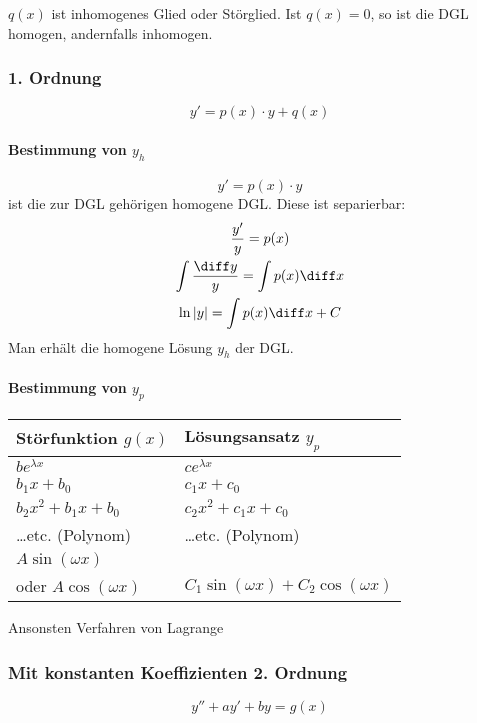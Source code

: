 		$q(x)$ ist inhomogenes Glied oder Störglied.
		Ist $q(x) = 0$, so ist die DGL homogen, andernfalls inhomogen.
		
		\subsubsection{1. Ordnung} %
			\[
				y' = p(x) \cdot y + q(x)
			\]
			
			\paragraph{Bestimmung von $y_h$} %
				\[
					y' = p(x) \cdot y
				\]
				ist die zur DGL gehörigen homogene DGL. Diese ist separierbar:
				\begin{gather*}
					\frac{y'}{y} = p(x) \\
					\int \frac{\diff y}{y} = \int p(x) \diff x \\
					\ln |y| = \int p(x) \diff x + C
				\end{gather*}
				Man erhält die homogene Lösung $y_h$ der DGL.
			
			\paragraph{Bestimmung von $y_p$} %
				
				\mbox{}
				\vspace{8pt}
				
				\begin{tabular}{l@{$\qquad$}l}
					\toprule
					\textbf{Störfunktion $g(x)$} & \textbf{Lösungsansatz $y_p$} \\
					\midrule
					$b e^{\lambda x}$ & $c e^{\lambda x}$ \\ [5pt]
					$b_1 x + b_0$ & $c_1 x + c_0$\\ [5pt]
					$b_2 x^2 + b_1 x + b_0$ & $c_2 x^2 + c_1 x + c_0$\\ [5pt]
					\ldots etc. (Polynom) & \ldots etc. (Polynom)\\ [5pt]
					$A \sin (\omega x)$ & \\
					oder $A \cos (\omega x)$ & $C_1 \sin (\omega x) + C_2 \cos (\omega x)$ \\
					\bottomrule
				\end{tabular}
				
				Ansonsten Verfahren von Lagrange
		\subsubsection{Mit konstanten Koeffizienten 2. Ordnung} %
			\[
				y'' + ay' + by = g(x)
			\]
			
